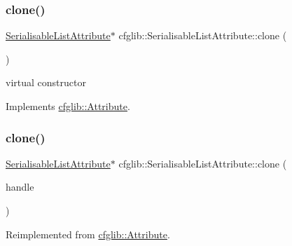 \subsubsection{\texorpdfstring{clone()}{clone()}\hspace{0.1cm}{\footnotesize\ttfamily [1/2]}}
{\footnotesize\ttfamily \hyperlink{classcfglib_1_1SerialisableListAttribute}{Serialisable\+List\+Attribute}$\ast$ cfglib\+::\+Serialisable\+List\+Attribute\+::clone (\begin{DoxyParamCaption}{ }\end{DoxyParamCaption})\hspace{0.3cm}{\ttfamily [virtual]}}

virtual constructor 

Implements \hyperlink{classcfglib_1_1Attribute_a107366042fdafe881215426059fec3f8}{cfglib\+::\+Attribute}.

\mbox{\label{classcfglib_1_1SerialisableListAttribute_a2bcd8907e26992e725a8a10b82288a0f}} 
\subsubsection{\texorpdfstring{clone()}{clone()}\hspace{0.1cm}{\footnotesize\ttfamily [2/2]}}
{\footnotesize\ttfamily \hyperlink{classcfglib_1_1SerialisableListAttribute}{Serialisable\+List\+Attribute}$\ast$ cfglib\+::\+Serialisable\+List\+Attribute\+::clone (\begin{DoxyParamCaption}\item[{\hyperlink{classcfglib_1_1CloneHandle}{Clone\+Handle} \&}]{handle }\end{DoxyParamCaption})\hspace{0.3cm}{\ttfamily [virtual]}}



Reimplemented from \hyperlink{classcfglib_1_1Attribute_a73490b82f9b31d8f30b813a2a9d3fe99}{cfglib\+::\+Attribute}.

\mbox{\label{classcfglib_1_1SerialisableListAttribute_a00e99bbe0a913edc157e027f9ba9b8f0}} 
